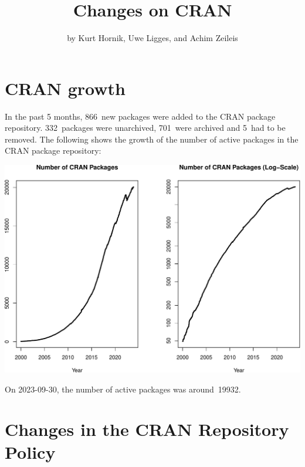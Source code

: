 \title{Changes on CRAN}


\author{by Kurt Hornik, Uwe Ligges, and Achim Zeileis}

\maketitle


\section{CRAN growth}\label{cran-growth}

In the past 5 months, 866~new packages were
added to the CRAN package repository. 332~packages
were unarchived, 701~were archived and
5~had to be removed. The following shows the
growth of the number of active packages in the CRAN package repository:

\begin{center}\includegraphics[width=1\linewidth,alt={CRAN growth: Number of CRAN packages over time in levels (left) and in logs (right).}]{RJ-2023-3-cran_files/figure-latex/cran_growth-1} \end{center}

\noindent On 2023-09-30, the number of active packages was around~19932.

\section{Changes in the CRAN Repository Policy}\label{changes-in-the-cran-repository-policy}

